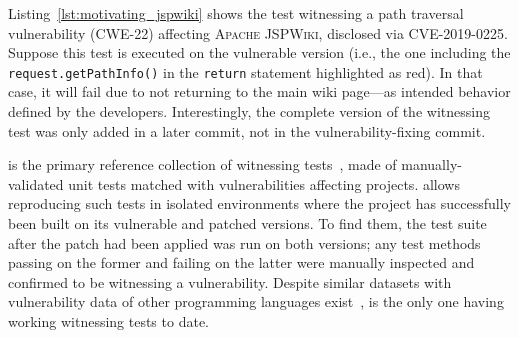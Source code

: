 Listing~\ref{lst:motivating_jspwiki} shows the test witnessing a path traversal vulnerability (CWE-22) affecting \textsc{Apache JSPWiki}, disclosed via CVE-2019-0225.
Suppose this test is executed on the vulnerable version (i.e., the one including the \texttt{request.getPathInfo()} in the \texttt{return} statement highlighted as red).
In that case, it will fail due to not returning to the main wiki page---as intended behavior defined by the developers.
Interestingly, the complete version of the witnessing test was only added in a later commit, not in the vulnerability-fixing commit.

%

\VulforJ is the primary reference collection of witnessing tests~\cite{bui:msr2022:vul4j}, made of manually-validated \vulforjWitTests unit tests matched with \vulforjVulns vulnerabilities affecting \vulforjProjects \Java projects.
\VulforJ allows reproducing such tests in isolated environments where the project has successfully been built on its vulnerable and patched versions.
To find them, the test suite after the patch had been applied was run on both versions; any test methods passing on the former and failing on the latter were manually inspected and confirmed to be witnessing a vulnerability.
Despite similar datasets with vulnerability data of other programming languages exist~\cite{Bhandari:promise2021:cvefixes,Fan:msr2020:bigvul,Nikitopoulos:fse2021:crossvul,ponta:msr2019:projectkb}, \VulforJ is the only one having working witnessing tests to date.

